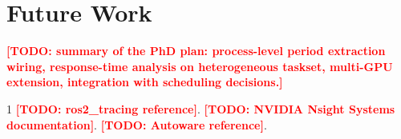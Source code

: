 \documentclass[conference]{IEEEtran}
\newcommand{\todoit}[1]{\textcolor{red}{\textbf{[TODO: #1]}}}
\begin{document}
\section{Future Work}
\todoit{summary of the PhD plan: process-level period extraction
wiring, response-time analysis on heterogeneous taskset, multi-GPU
extension, integration with scheduling decisions.}


\begin{thebibliography}{1}
\todoit{ros2\_tracing reference}.
\todoit{NVIDIA Nsight Systems documentation}.
\todoit{Autoware reference}.
\end{thebibliography}
\end{document}
